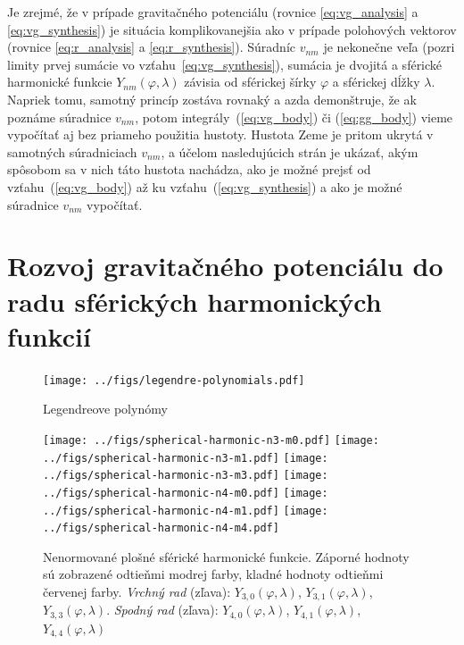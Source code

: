 \documentclass[a4paper, 12pt]{book}
\begin{document}
Je zrejmé, že v prípade gravitačného potenciálu (rovnice \ref{eq:vg_analysis} 
a \ref{eq:vg_synthesis}) je situácia komplikovanejšia ako v prípade polohových 
vektorov (rovnice \ref{eq:r_analysis} a \ref{eq:r_synthesis}).  Súradníc 
$v_{nm}$ je nekonečne veľa (pozri limity prvej sumácie vo 
vzťahu~\ref{eq:vg_synthesis}), sumácia je dvojitá a sférické harmonické funkcie 
$Y_{nm}(\varphi, \lambda)$ závisia od sférickej šírky $\varphi$ a sférickej 
dĺžky $\lambda$.  Napriek tomu, samotný princíp zostáva rovnaký a azda 
demonštruje, že ak poznáme súradnice $v_{nm}$, potom 
integrály~(\ref{eq:vg_body}) či (\ref{eq:gg_body}) vieme vypočítať aj bez 
priameho použitia hustoty.  Hustota Zeme je pritom ukrytá v samotných 
súradniciach $v_{nm}$, a účelom nasledujúcich strán je ukázať, akým spôsobom sa 
v nich táto hustota nachádza, ako je možné prejsť od vzťahu~(\ref{eq:vg_body}) 
až ku vzťahu~(\ref{eq:vg_synthesis}) a ako je možné súradnice $v_{nm}$ 
vypočítať.



\section{Rozvoj gravitačného potenciálu do radu sférických harmonických 
funkcií}




\begin{figure}[bt]
\centering
\texttt{[image: ../figs/legendre-polynomials.pdf]}
\caption{Legendreove polynómy}
\end{figure}




\begin{figure}[bt]
\centering
\texttt{[image: ../figs/spherical-harmonic-n3-m0.pdf]}
\texttt{[image: ../figs/spherical-harmonic-n3-m1.pdf]}
\texttt{[image: ../figs/spherical-harmonic-n3-m3.pdf]}
\texttt{[image: ../figs/spherical-harmonic-n4-m0.pdf]}
\texttt{[image: ../figs/spherical-harmonic-n4-m1.pdf]}
\texttt{[image: ../figs/spherical-harmonic-n4-m4.pdf]}
\caption{Nenormované plošné sférické harmonické funkcie.  Záporné hodnoty sú 
zobrazené odtieňmi modrej farby, kladné hodnoty odtieňmi červenej farby.  
\textit{Vrchný rad} (zľava): $Y_{3,0}(\varphi, \lambda)$, $Y_{3,1}(\varphi, 
\lambda)$, $Y_{3,3}(\varphi, \lambda)$.  \textit{Spodný rad} (zľava): 
$Y_{4,0}(\varphi, \lambda)$, $Y_{4,1}(\varphi, \lambda)$, $Y_{4,4}(\varphi, 
\lambda)$}
\label{fig:sh}
\end{figure}
\end{document}
